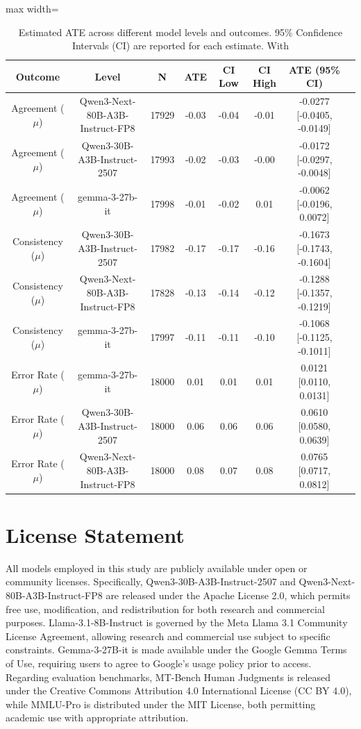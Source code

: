 \documentclass[11pt]{article}
\begin{document}
\begin{table}[htbp]
\centering
\begin{adjustbox}{max width=\textwidth}
\begin{tabular}{cccccccc}
\toprule
Outcome & Level & N & ATE & CI Low & CI High & ATE (95\% CI) \\
\midrule
Agreement ($\mu$)   & Qwen3-Next-80B-A3B-Instruct-FP8 & 17929 & -0.03 & -0.04 & -0.01 & -0.0277 [-0.0405, -0.0149] \\
Agreement ($\mu$)   & Qwen3-30B-A3B-Instruct-2507     & 17993 & -0.02 & -0.03 & -0.00 & -0.0172 [-0.0297, -0.0048] \\
Agreement ($\mu$)   & gemma-3-27b-it                  & 17998 & -0.01 & -0.02 &  0.01 & -0.0062 [-0.0196, 0.0072] \\
Consistency ($\mu$) & Qwen3-30B-A3B-Instruct-2507     & 17982 & -0.17 & -0.17 & -0.16 & -0.1673 [-0.1743, -0.1604] \\
Consistency ($\mu$) & Qwen3-Next-80B-A3B-Instruct-FP8 & 17828 & -0.13 & -0.14 & -0.12 & -0.1288 [-0.1357, -0.1219] \\
Consistency ($\mu$) & gemma-3-27b-it                  & 17997 & -0.11 & -0.11 & -0.10 & -0.1068 [-0.1125, -0.1011] \\
Error Rate ($\mu$)  & gemma-3-27b-it                  & 18000 &  0.01 &  0.01 &  0.01 &  0.0121 [0.0110, 0.0131] \\
Error Rate ($\mu$)  & Qwen3-30B-A3B-Instruct-2507     & 18000 &  0.06 &  0.06 &  0.06 &  0.0610 [0.0580, 0.0639] \\
Error Rate ($\mu$)  & Qwen3-Next-80B-A3B-Instruct-FP8 & 18000 &  0.08 &  0.07 &  0.08 &  0.0765 [0.0717, 0.0812] \\
\bottomrule
\end{tabular}
\end{adjustbox}
\caption{Estimated ATE across different model levels and outcomes. 95\% Confidence Intervals (CI) are reported for each estimate. With }
\label{tab:ate_model}
\end{table}



\section{License Statement}

All models employed in this study are publicly available under open or community licenses. Specifically, Qwen3-30B-A3B-Instruct-2507 and Qwen3-Next-80B-A3B-Instruct-FP8 are released under the Apache License 2.0, which permits free use, modification, and redistribution for both research and commercial purposes. Llama-3.1-8B-Instruct is governed by the Meta Llama 3.1 Community License Agreement, allowing research and commercial use subject to specific constraints. Gemma-3-27B-it is made available under the Google Gemma Terms of Use, requiring users to agree to Google's usage policy prior to access. Regarding evaluation benchmarks, MT-Bench Human Judgments is released under the Creative Commons Attribution 4.0 International License (CC BY 4.0), while MMLU-Pro is distributed under the MIT License, both permitting academic use with appropriate attribution.
\end{document}
